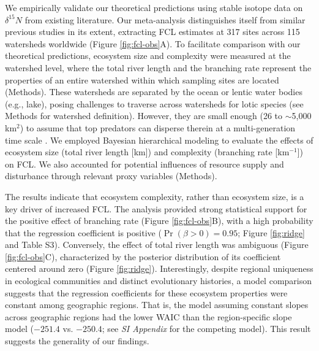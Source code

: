 \documentclass[11pt, class=article, crop=false]{standalone}
\begin{document}
We empirically validate our theoretical predictions using stable isotope data on $\delta^{15}N$ from existing literature.
Our meta-analysis distinguishes itself from similar previous studies in its extent, extracting FCL estimates at 317 sites across 115 watersheds worldwide (Figure \ref{fig:fcl-obs}A).
To facilitate comparison with our theoretical predictions, ecosystem size and complexity were measured at the watershed level, where the total river length and the branching rate represent the properties of an entire watershed within which sampling sites are located (Methods).
These watersheds are separated by the ocean or lentic water bodies (e.g., lake), posing challenges to traverse across watersheds for lotic species (see Methods for watershed definition).
However, they are small enough (26 to $\sim$5,000 km$^2$) to assume that top predators can disperse therein at a multi-generation time scale \citep{comte_fish_2018}.
We employed Bayesian hierarchical modeling to evaluate the effects of ecosystem size (total river length [km]) and complexity (branching rate [km$^{-1}$]) on FCL.
We also accounted for potential influences of resource supply and disturbance through relevant proxy variables (Methods).

The results indicate that ecosystem complexity, rather than ecosystem size, is a key driver of increased FCL.
The analysis provided strong statistical support for the positive effect of branching rate (Figure \ref{fig:fcl-obs}B), with a high probability that the regression coefficient is positive ($\Pr(\beta > 0) = 0.95$; Figure \ref{fig:ridge} and Table S3).
Conversely, the effect of total river length was ambiguous (Figure \ref{fig:fcl-obs}C), characterized by the posterior distribution of its coefficient centered around zero (Figure \ref{fig:ridge}).
Interestingly, despite regional uniqueness in ecological communities and distinct evolutionary histories, a model comparison suggests that the regression coefficients for these ecosystem properties were constant among geographic regions.
That is, the model assuming constant slopes across geographic regions had the lower WAIC \citep{watanabe_asymptotic_2010} than the region-specific slope model ($-251.4$ vs. $-250.4$; see \textit{SI Appendix} for the competing model).
This result suggests the generality of our findings. 
\end{document}
